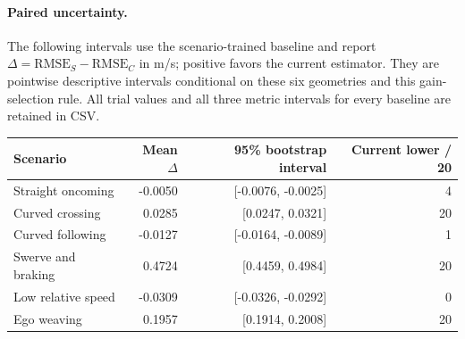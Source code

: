 \documentclass[11pt]{article}
\begin{document}
\paragraph{Paired uncertainty.}
The following intervals use the scenario-trained baseline and report
$\Delta=\mathrm{RMSE}_{S}-\mathrm{RMSE}_{C}$ in m/s; positive favors the
current estimator. They are pointwise descriptive intervals conditional on
these six geometries and this gain-selection rule. All trial values and all
three metric intervals for every baseline are retained in CSV.
\begin{center}\small
\begin{tabular}{@{}lrrr@{}}
\toprule
Scenario&Mean $\Delta$&95\% bootstrap interval&Current lower / 20\\
\midrule
Straight oncoming & -0.0050 & [-0.0076, -0.0025] & 4 \\
Curved crossing & 0.0285 & [0.0247, 0.0321] & 20 \\
Curved following & -0.0127 & [-0.0164, -0.0089] & 1 \\
Swerve and braking & 0.4724 & [0.4459, 0.4984] & 20 \\
Low relative speed & -0.0309 & [-0.0326, -0.0292] & 0 \\
Ego weaving & 0.1957 & [0.1914, 0.2008] & 20 \\
\bottomrule
\end{tabular}\end{center}
\end{document}
